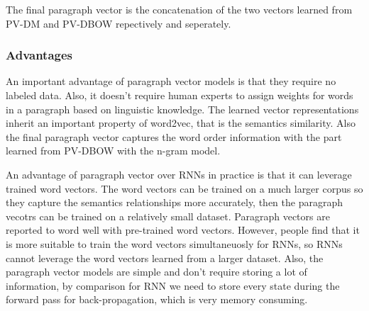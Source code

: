 The final paragraph vector is the concatenation of the two vectors learned from PV-DM and PV-DBOW repectively and seperately.

\subsubsection{Advantages}

An important advantage of paragraph vector models is that they require no labeled data. Also, it doesn't require human experts to assign weights for words in a paragraph based on linguistic knowledge. The learned vector representations inherit an important property of word2vec, that is the semantics similarity. Also the final paragraph vector captures the word order information with the part learned from PV-DBOW with the n-gram model.

An advantage of paragraph vector over RNNs in practice is that it can leverage trained word vectors. The word vectors can be trained on a much larger corpus so they capture the semantics relationships more accurately, then the paragraph vecotrs can be trained on a relatively small dataset. Paragraph vectors are reported to word well with pre-trained word vectors. However, people find that it is more suitable to train the word vectors simultaneuosly for RNNs, so RNNs cannot leverage the word vectors learned from a larger dataset. Also, the paragraph vector models are simple and don't require storing a lot of information, by comparison for RNN we need to store every state during the forward pass for back-propagation, which is very memory consuming.
